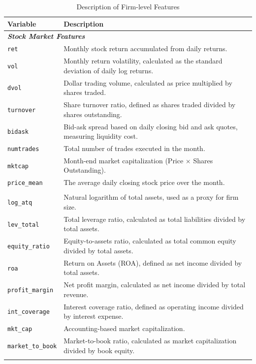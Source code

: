 \documentclass[12pt]{article}
\begin{document}
\begin{singlespace}
\begin{table}[H]
\centering
\caption{Description of Firm-level Features}
\label{tab:firm_features}
\begin{tabular}{l p{10cm}}
\toprule
\textbf{Variable} & \textbf{Description} \\
\midrule
\multicolumn{2}{l}{\textit{\textbf{Stock Market Features}}} \\
\texttt{ret} & Monthly stock return accumulated from daily returns. \\
\texttt{vol} & Monthly return volatility, calculated as the standard deviation of daily log returns. \\
\texttt{dvol} & Dollar trading volume, calculated as price multiplied by shares traded. \\
\texttt{turnover} & Share turnover ratio, defined as shares traded divided by shares outstanding. \\
\texttt{bidask} & Bid-ask spread based on daily closing bid and ask quotes, measuring liquidity cost. \\
\texttt{numtrades} & Total number of trades executed in the month. \\
\texttt{mktcap} & Month-end market capitalization (Price $\times$ Shares Outstanding). \\
\texttt{price\_mean} & The average daily closing stock price over the month. \\
\addlinespace

\multicolumn{2}{l}{\textit{\textbf{Accounting-Based Derived Indicators}}} \\
\texttt{log\_atq} & Natural logarithm of total assets, used as a proxy for firm size. \\
\texttt{lev\_total} & Total leverage ratio, calculated as total liabilities divided by total assets. \\
\texttt{equity\_ratio} & Equity-to-assets ratio, calculated as total common equity divided by total assets. \\
\texttt{roa} & Return on Assets (ROA), defined as net income divided by total assets. \\
\texttt{profit\_margin} & Net profit margin, calculated as net income divided by total revenue. \\
\texttt{int\_coverage} & Interest coverage ratio, defined as operating income divided by interest expense. \\
\texttt{mkt\_cap} & Accounting-based market capitalization. \\
\texttt{market\_to\_book} & Market-to-book ratio, calculated as market capitalization divided by book equity. \\
\addlinespace


\end{tabular}
\end{table}
\end{singlespace}
\end{document}
